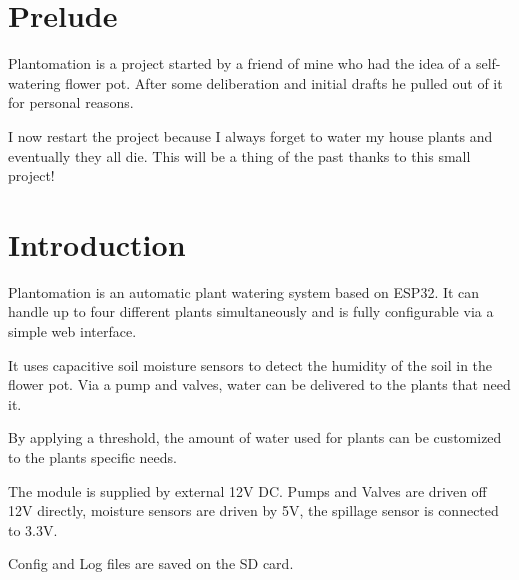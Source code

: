 \chapter{Prelude}

Plantomation is a project started by a friend of mine who had the idea of a self-watering flower pot. After some deliberation and initial drafts he pulled out of it for personal reasons. 

I now restart the project because I always forget to water my house plants and eventually they all die. This will be a thing of the past thanks to this small project!

{\let\clearpage\relax \chapter{Introduction}}

Plantomation is an automatic plant watering system based on ESP32. It can handle up to four different plants simultaneously and is fully configurable via a simple web interface.

It uses capacitive soil moisture sensors to detect the humidity of the soil in the flower pot. Via a pump and valves, water can be delivered to the plants that need it. 

By applying a threshold, the amount of water used for plants can be customized to the plants specific needs.

The module is supplied by external 12V DC. Pumps and Valves are driven off 12V directly, moisture sensors are driven by 5V, the spillage sensor is connected to 3.3V.

Config and Log files are saved on the SD card. 
